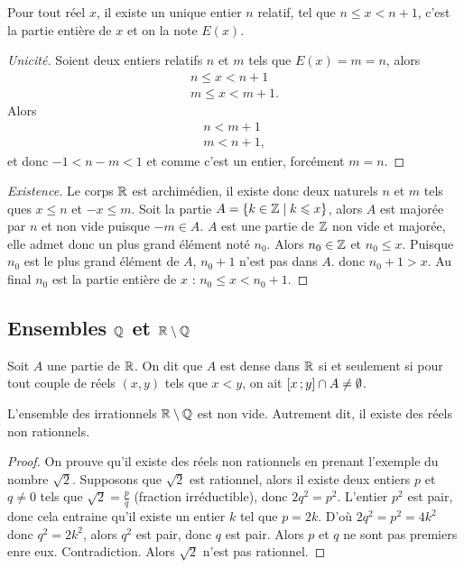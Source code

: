 \begin{prop}
  Pour tout réel \(x\), il existe un unique entier \(n\) relatif, tel que 
  \(n\leqslant x<n+1\), c'est la partie entière de \(x\) et on la note \(E(x)\).
\end{prop}
\begin{proof}[Unicité]
  Soient deux entiers relatifs \(n\) et \(m\) tels que \(E(x)=m=n\), alors
  \begin{align}
    n\leqslant x< n+1 \\  m\leqslant x< m+1.
  \end{align}
  Alors
  \begin{align}
    n<m+1 \\  m<n+1,
  \end{align}
  et donc \(-1<n-m<1\) et comme c'est un entier, forcément \(m=n\).
\end{proof}
\begin{proof}[Existence]
  Le corps \(\mathbb{R}\) est archimédien, il existe donc deux naturels \(n\) et \(m\) 
  tels ques \(x\leqslant n\) et  \(-x\leqslant m\). Soit la partie \(A=\left\{k 
  \in \mathbb{Z}\mathrel{}\middle|\mathrel{}k\leqslant x\right\}\), alors \(A\) est majorée par \(n\) et non vide puisque 
  \(-m\in A\). \(A\) est une partie de \(\mathbb{Z}\) non vide et majorée, elle admet 
  donc un plus grand élément noté \(n_0\). Alors \(n_0\in \mathbb{Z}\) et \(n_0\leqslant 
  x\). Puisque \(n_0\) est le plus grand élément de \(A\), \(n_0+1\) n'est pas 
  dans \(A\). donc \(n_0+1>x\). Au final \(n_0\) est la partie entière de \(x\) 
  : \(n_0\leqslant x<n_0+1\).
\end{proof}

\subsection{Ensembles \(\mathbb{Q}\) et \(\mathbb{R}\setminus\mathbb{Q}\)}

\begin{defdef}[Densité]
  Soit \(A\) une partie de \(\mathbb{R}\). On dit que \(A\) est dense dans \(\mathbb{R}\) si et 
  seulement si pour tout couple de réels \((x,y)\) tels que \(x<y\), on ait 
  \(\left[ x \, ;  y \right]\cap A \neq \emptyset\).
\end{defdef}
\begin{prop}
  L'ensemble des irrationnels \(\mathbb{R}\setminus\mathbb{Q}\) est non vide. Autrement dit, il 
  existe des réels non rationnels.
\end{prop}
\begin{proof}
  On prouve  qu'il existe des réels non rationnels en prenant l'exemple du 
  nombre \(\sqrt{2}\). Supposons que \(\sqrt{2}\) est rationnel, alors il existe 
  deux entiers \(p\) et \(q \neq 0\) tels que \(\sqrt{2}=\frac{p}{q}\) (fraction 
  irréductible), donc \(2q^2=p^2\). L'entier \(p^2\) est pair, donc cela 
  entraine qu'il existe un entier \(k\) tel que \(p=2k\). D'où \(2q^2=p^2=4k^2\) 
  donc \(q^2=2k^2\), alors \(q^2\) est pair, donc \(q\) est pair. Alors \(p\) et 
  \(q\) ne sont pas premiers enre eux. Contradiction. Alors \(\sqrt{2}\) n'est 
  pas rationnel.
\end{proof}

